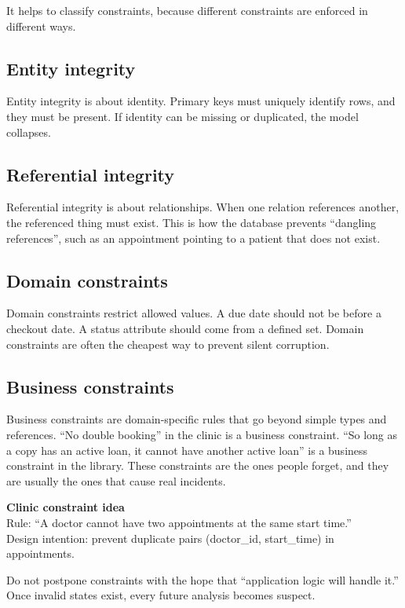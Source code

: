 It helps to classify constraints, because different constraints are enforced in different ways.

\subsection{Entity integrity}
Entity integrity is about identity.
Primary keys must uniquely identify rows, and they must be present.
If identity can be missing or duplicated, the model collapses.

\subsection{Referential integrity}
Referential integrity is about relationships.
When one relation references another, the referenced thing must exist.
This is how the database prevents “dangling references”, such as an appointment pointing to a patient that does not exist.

\subsection{Domain constraints}
Domain constraints restrict allowed values.
A due date should not be before a checkout date.
A status attribute should come from a defined set.
Domain constraints are often the cheapest way to prevent silent corruption.

\subsection{Business constraints}
Business constraints are domain-specific rules that go beyond simple types and references.
“No double booking” in the clinic is a business constraint.
“So long as a copy has an active loan, it cannot have another active loan” is a business constraint in the library.
These constraints are the ones people forget, and they are usually the ones that cause real incidents.

\begin{examplebox}
\textbf{Clinic constraint idea}\\
Rule: “A doctor cannot have two appointments at the same start time.”\\
Design intention: prevent duplicate pairs (doctor\_id, start\_time) in appointments.
\end{examplebox}

\begin{notebox}
Do not postpone constraints with the hope that “application logic will handle it.”
Once invalid states exist, every future analysis becomes suspect.
\end{notebox}

